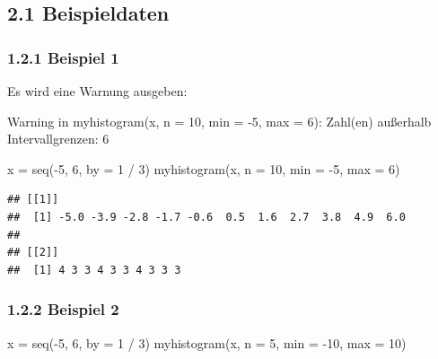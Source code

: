 \documentclass[
]{article}
\newenvironment{Shaded}{\begin{snugshade}}{\end{snugshade}}
\newcommand{\AttributeTok}[1]{\textcolor[rgb]{0.77,0.63,0.00}{#1}}
\newcommand{\DecValTok}[1]{\textcolor[rgb]{0.00,0.00,0.81}{#1}}
\newcommand{\FunctionTok}[1]{\textcolor[rgb]{0.00,0.00,0.00}{#1}}
\newcommand{\NormalTok}[1]{#1}
\newcommand{\OtherTok}[1]{\textcolor[rgb]{0.56,0.35,0.01}{#1}}
\newcommand{\SpecialCharTok}[1]{\textcolor[rgb]{0.00,0.00,0.00}{#1}}
\begin{document}
\hypertarget{beispieldaten}{%
\subsection{2.1 Beispieldaten}\label{beispieldaten}}

\hypertarget{beispiel-1}{%
\subsubsection{1.2.1 Beispiel 1}\label{beispiel-1}}

Es wird eine Warnung ausgeben:

Warning in myhistogram(x, n = 10, min = -5, max = 6): Zahl(en) außerhalb
Intervallgrenzen: 6

\begin{Shaded}
\begin{Highlighting}[]
\NormalTok{x }\OtherTok{=} \FunctionTok{seq}\NormalTok{(}\SpecialCharTok{{-}}\DecValTok{5}\NormalTok{, }\DecValTok{6}\NormalTok{, }\AttributeTok{by =} \DecValTok{1} \SpecialCharTok{/} \DecValTok{3}\NormalTok{)}
\FunctionTok{myhistogram}\NormalTok{(x, }\AttributeTok{n =} \DecValTok{10}\NormalTok{, }\AttributeTok{min =} \SpecialCharTok{{-}}\DecValTok{5}\NormalTok{, }\AttributeTok{max =} \DecValTok{6}\NormalTok{)}
\end{Highlighting}
\end{Shaded}

\begin{verbatim}
## [[1]]
##  [1] -5.0 -3.9 -2.8 -1.7 -0.6  0.5  1.6  2.7  3.8  4.9  6.0
## 
## [[2]]
##  [1] 4 3 3 4 3 3 4 3 3 3
\end{verbatim}

\hypertarget{beispiel-2}{%
\subsubsection{1.2.2 Beispiel 2}\label{beispiel-2}}

\begin{Shaded}
\begin{Highlighting}[]
\NormalTok{x }\OtherTok{=} \FunctionTok{seq}\NormalTok{(}\SpecialCharTok{{-}}\DecValTok{5}\NormalTok{, }\DecValTok{6}\NormalTok{, }\AttributeTok{by =} \DecValTok{1} \SpecialCharTok{/} \DecValTok{3}\NormalTok{)}
\FunctionTok{myhistogram}\NormalTok{(x, }\AttributeTok{n =} \DecValTok{5}\NormalTok{, }\AttributeTok{min =} \SpecialCharTok{{-}}\DecValTok{10}\NormalTok{, }\AttributeTok{max =} \DecValTok{10}\NormalTok{)}
\end{Highlighting}
\end{Shaded}
\end{document}
